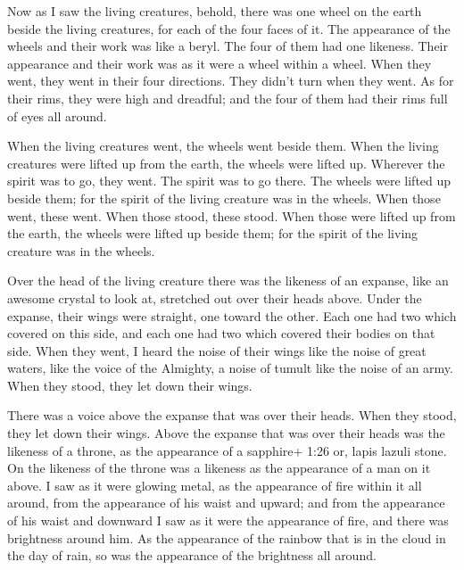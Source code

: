  Now as I saw the living creatures, behold, there was one
wheel on the earth beside the living creatures, for each of the four
faces of it.  The appearance of the wheels and their work
was like a beryl. The four of them had one likeness. Their appearance
and their work was as it were a wheel within a wheel.  When
they went, they went in their four directions. They didn't turn when
they went.  As for their rims, they were high and dreadful;
and the four of them had their rims full of eyes all around.

 When the living creatures went, the wheels went beside
them. When the living creatures were lifted up from the earth, the
wheels were lifted up.  Wherever the spirit was to go, they
went. The spirit was to go there. The wheels were lifted up beside them;
for the spirit of the living creature was in the wheels. 
When those went, these went. When those stood, these stood. When those
were lifted up from the earth, the wheels were lifted up beside them;
for the spirit of the living creature was in the wheels.

 Over the head of the living creature there was the
likeness of an expanse, like an awesome crystal to look at, stretched
out over their heads above.  Under the expanse, their wings
were straight, one toward the other. Each one had two which covered on
this side, and each one had two which covered their bodies on that side.
 When they went, I heard the noise of their wings like the
noise of great waters, like the voice of the Almighty, a noise of tumult
like the noise of an army. When they stood, they let down their wings.

 There was a voice above the expanse that was over their
heads. When they stood, they let down their wings.  Above
the expanse that was over their heads was the likeness of a throne, as
the appearance of a sapphire+ 1:26 or, lapis lazuli stone. On the
likeness of the throne was a likeness as the appearance of a man on it
above.  I saw as it were glowing metal, as the appearance
of fire within it all around, from the appearance of his waist and
upward; and from the appearance of his waist and downward I saw as it
were the appearance of fire, and there was brightness around him.
 As the appearance of the rainbow that is in the cloud in
the day of rain, so was the appearance of the brightness all around.


